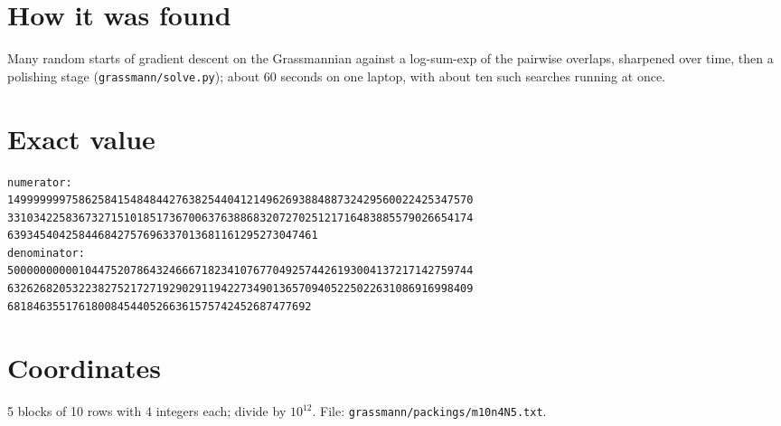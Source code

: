 \documentclass[11pt,a4paper]{article}
\begin{document}
\section{How it was found}
Many random starts of gradient descent on the Grassmannian against a log-sum-exp of the pairwise overlaps, sharpened over time, then a polishing stage (\texttt{grassmann/solve.py}); about 60 seconds on one laptop, with about ten such searches running at once.


\appendix
\section{Exact value}
{\small
\begin{verbatim}
numerator:
149999999758625841548484427638254404121496269388488732429560022425347570
331034225836732715101851736700637638868320727025121716483885579026654174
639345404258446842757696337013681161295273047461
denominator:
500000000001044752078643246667182341076770492574426193004137217142759744
632626820532238275217271929029119422734901365709405225022631086916998409
68184635517618008454405266361575742452687477692
\end{verbatim}}

\section{Coordinates}
5 blocks of 10 rows with 4 integers each; divide by $10^{12}$. File: \texttt{grassmann/packings/m10n4N5.txt}.
{\tiny
\begin{multicols}{3}
\end{multicols}}
\end{document}
